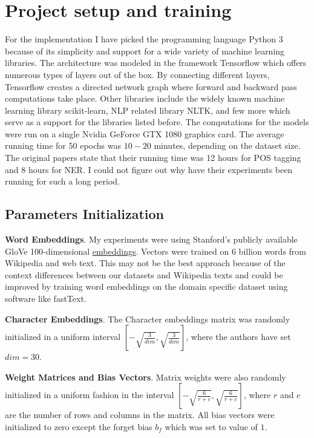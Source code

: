 \section{Project setup and training}
For the implementation I have picked the programming language
Python 3 because of its simplicity and support for a wide variety of
machine learning libraries. The architecture was modeled in the framework
Tensorflow which offers numerous types of layers out of the box. By connecting
different layers, Tensorflow creates a directed network graph where forward
and backward pass computations take place. Other libraries include the widely known
machine learning library scikit-learn\cite{pedregosa2011scikit}, NLP related library
NLTK, and few more which serve as a support for the libraries
listed before. The computations for the models were run on a single Nvidia GeForce
GTX 1080 graphics card. The average running time for $50$ epochs was $10
- 20$ minutes, depending on the dataset size. The original papers state that
their running time was 12 hours for POS tagging and 8 hours for NER. I could
not figure out why have their experiments been running for such a long period.

\subsection{Parameters Initialization}
\textbf{Word Embeddings}. My experiments were using Stanford's publicly
available GloVe 100-dimensional
\href{http://nlp.stanford.edu/projects/glove/}{embeddings}. Vectors were
trained on 6 billion words from Wikipedia and web text\cite{pennington2014glove}. This may
not be the best approach because of the context differences between our
datasets and Wikipedia texts and could be improved by training word embeddings
on the domain specific dataset using software like
fastText\cite{bojanowski2016enriching}.

\textbf{Character Embeddings}. The Character embeddings matrix was randomly initialized
in a uniform interval $\left[-\sqrt{\frac{3}{dim}},
\sqrt{\frac{3}{dim}}\right]$, where the authors have set $dim = 30$.

\textbf{Weight Matrices and Bias Vectors}. Matrix weights were also randomly
initialized in a uniform fashion in the interval $\left[-\sqrt{\frac{6}{r+c}},
\sqrt{\frac{6}{r+c}}\right]$, where $r$ and $c$ are the number of rows and
columns in the matrix. All bias vectors were initialized
to zero except the forget bias $b_f$ which was set to value of $1$. 

